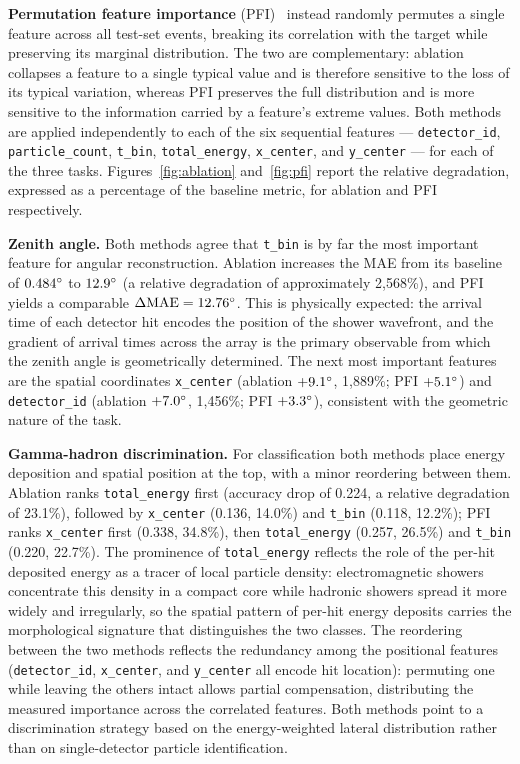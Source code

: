 \textbf{Permutation feature importance} (PFI)~ instead randomly permutes a single feature across all test-set events, breaking its correlation with the target while preserving its marginal distribution. The two are complementary: ablation collapses a feature to a single typical value and is therefore sensitive to the loss of its typical variation, whereas PFI preserves the full distribution and is more sensitive to the information carried by a feature's extreme values. Both methods are applied independently to each of the six sequential features --- \texttt{detector\_id}, \texttt{particle\_count}, \texttt{t\_bin}, \texttt{total\_energy}, \texttt{x\_center}, and \texttt{y\_center} --- for each of the three tasks. Figures~\ref{fig:ablation} and~\ref{fig:pfi} report the relative degradation, expressed as a percentage of the baseline metric, for ablation and PFI respectively.

\textbf{Zenith angle.} Both methods agree that \texttt{t\_bin} is by far the most important feature for angular reconstruction. Ablation increases the MAE from its baseline of $0.484\degree$ to $12.9\degree$ (a relative degradation of approximately 2{,}568\%), and PFI yields a comparable $\Delta\text{MAE} = 12.76\degree$. This is physically expected: the arrival time of each detector hit encodes the position of the shower wavefront, and the gradient of arrival times across the array is the primary observable from which the zenith angle is geometrically determined. The next most important features are the spatial coordinates \texttt{x\_center} (ablation $+9.1\degree$, 1{,}889\%; PFI $+5.1\degree$) and \texttt{detector\_id} (ablation $+7.0\degree$, 1{,}456\%; PFI $+3.3\degree$), consistent with the geometric nature of the task.

\textbf{Gamma-hadron discrimination.} For classification both methods place energy deposition and spatial position at the top, with a minor reordering between them. Ablation ranks \texttt{total\_energy} first (accuracy drop of 0.224, a relative degradation of 23.1\%), followed by \texttt{x\_center} (0.136, 14.0\%) and \texttt{t\_bin} (0.118, 12.2\%); PFI ranks \texttt{x\_center} first (0.338, 34.8\%), then \texttt{total\_energy} (0.257, 26.5\%) and \texttt{t\_bin} (0.220, 22.7\%). The prominence of \texttt{total\_energy} reflects the role of the per-hit deposited energy as a tracer of local particle density: electromagnetic showers concentrate this density in a compact core while hadronic showers spread it more widely and irregularly, so the spatial pattern of per-hit energy deposits carries the morphological signature that distinguishes the two classes. The reordering between the two methods reflects the redundancy among the positional features (\texttt{detector\_id}, \texttt{x\_center}, and \texttt{y\_center} all encode hit location): permuting one while leaving the others intact allows partial compensation, distributing the measured importance across the correlated features. Both methods point to a discrimination strategy based on the energy-weighted lateral distribution rather than on single-detector particle identification.

